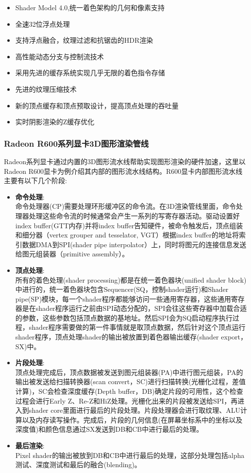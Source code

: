 \begin{itemize}

\item{}Shader Model 4.0,统一着色架构的几何和像素支持
\item{}全速32位浮点处理
\item{}支持浮点融合，纹理过滤和抗锯齿的HDR渲染
\item{}高性能动态分支与控制流技术
\item{}采用先进的缓存系统实现几乎无限的着色指令存储
\item{}先进的纹理压缩技术
\item{}新的顶点缓存和顶点预取设计，提高顶点处理的吞吐量
\item{}实时阴影渲染的Z缓存优化

\end{itemize}

\subsubsection{Radeon R600系列显卡3D图形渲染管线}

Radeon系列显卡通过内置的3D图形流水线帮助实现图形渲染的硬件加速，这里以Radeon R600显卡为例介绍其内部的图形流水线结构。R600显卡内部图形流水线主要有以下几个阶段:

\begin{itemize}
\item{\textbf{命令处理}}: \\
命令处理器(CP)需要处理环形缓冲区的命令流。在3D渲染管线里面，命令处理器处理这些命令流的时候通常会产生一系列的写寄存器活动。驱动设置好index buffer(GTT内存)并将index buffer告知硬件，被命令触发后，顶点组装和细分器（vertex grouper and tesselator, VGT）根据index buffer的地址将索引数据DMA到SPI(shader pipe interpolator）上，同时将图元的连接信息发送给图元组装器（primitive assembly）。
\item{\textbf{顶点处理}}: \\
所有的着色处理(shader processing)都是在统一着色器块(unified shader block)中进行的，统一着色器块包含Sequencer(SQ，控制shader运行)和Shader pipe(SP)模块，每一个shader程序都能够访问一些通用寄存器，这些通用寄存器是在shader程序运行之前由SPI动态分配的，SPI会往这些寄存器中加载合适的参数，这些参数包括顶点数据的基地址。然后SPI会为SQ启动程序执行过程，shader程序需要做的第一件事情就是取顶点数据，然后针对这个顶点运行shader程序，顶点处理shader的输出被放置到着色器输出缓存(shader export，SX)中\cite{R600-ISA}。
\item{\textbf{片段处理}}: \\
顶点处理完成后，顶点数据被发送到图元组装器(PA)中进行图元组装，PA的输出被发送给扫描转换器(scan convert，SC)进行扫描转换(光栅化过程，差值计算)，SC会检查深度缓存(Depth buffer，DB)确定片段的可用性，这个检查过程会进行Early Z、Re-Z和HiZ处理。光栅化出来的片段被发送给SPI，再进入到shader core里面进行最后的片段处理。片段处理器会进行取纹理、ALU计算以及内存读写操作。完成后，片段的几何信息(在屏幕坐标系中的坐标以及深度值)和颜色信息通过SX发送到DB和CB中进行最后的处理。
\item{\textbf{最后渲染}}: \\
Pixel shader的输出被放到DB和CB中进行最后的处理，这部分处理包括alpha测试、深度测试和最后的融合(blending)。
\end{itemize}

